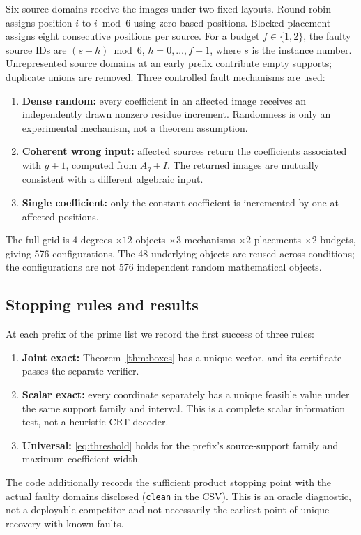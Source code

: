 \documentclass[11pt]{article}
\theoremstyle{definition}\newtheorem{definition}[theorem]{Definition}
\begin{document}
Six source domains receive the images under two fixed layouts. Round robin assigns position $i$ to $i\bmod6$ using zero-based positions. Blocked placement assigns eight consecutive positions per source. For a budget $f\in\{1,2\}$, the faulty source IDs are $(s+h)\bmod6$, $h=0,\ldots,f-1$, where $s$ is the instance number. Unrepresented source domains at an early prefix contribute empty supports; duplicate unions are removed. Three controlled fault mechanisms are used:
\begin{enumerate}
\item \textbf{Dense random:} every coefficient in an affected image receives an independently drawn nonzero residue increment. Randomness is only an experimental mechanism, not a theorem assumption.
\item \textbf{Coherent wrong input:} affected sources return the coefficients associated with $g+1$, computed from $A_g+I$. The returned images are mutually consistent with a different algebraic input.
\item \textbf{Single coefficient:} only the constant coefficient is incremented by one at affected positions.
\end{enumerate}
The full grid is $4$ degrees $\times12$ objects $\times3$ mechanisms $\times2$ placements $\times2$ budgets, giving 576 configurations. The 48 underlying objects are reused across conditions; the configurations are not 576 independent random mathematical objects.

\subsection{Stopping rules and results}
At each prefix of the prime list we record the first success of three rules:
\begin{enumerate}
\item \textbf{Joint exact:} Theorem~\ref{thm:boxes} has a unique vector, and its certificate passes the separate verifier.
\item \textbf{Scalar exact:} every coordinate separately has a unique feasible value under the same support family and interval. This is a complete scalar information test, not a heuristic CRT decoder.
\item \textbf{Universal:} \eqref{eq:threshold} holds for the prefix's source-support family and maximum coefficient width.
\end{enumerate}
The code additionally records the sufficient product stopping point with the actual faulty domains disclosed (\texttt{clean} in the CSV). This is an oracle diagnostic, not a deployable competitor and not necessarily the earliest point of unique recovery with known faults.
\end{document}
